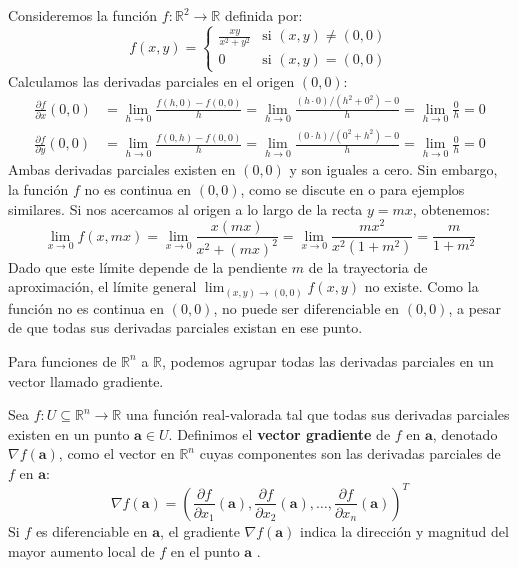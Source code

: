 \begin{counterexample}

Consideremos la función $f: \mathbb{R}^2 \to \mathbb{R}$ definida por:
\[ f(x,y) = \begin{cases} \frac{xy}{x^2+y^2} & \text{si } (x,y) \neq (0,0) \\ 0 & \text{si } (x,y) = (0,0) \end{cases} \]
Calculamos las derivadas parciales en el origen $(0,0)$:
\begin{align*}
\frac{\partial f}{\partial x}(0,0) &= \lim_{h \to 0} \frac{f(h,0) - f(0,0)}{h} = \lim_{h \to 0} \frac{(h \cdot 0)/(h^2+0^2) - 0}{h} = \lim_{h \to 0} \frac{0}{h} = 0 \\
\frac{\partial f}{\partial y}(0,0) &= \lim_{h \to 0} \frac{f(0,h) - f(0,0)}{h} = \lim_{h \to 0} \frac{(0 \cdot h)/(0^2+h^2) - 0}{h} = \lim_{h \to 0} \frac{0}{h} = 0
\end{align*}
Ambas derivadas parciales existen en $(0,0)$ y son iguales a cero. Sin embargo, la función $f$ no es continua en $(0,0)$, como se discute en \citet{Apostol1974} o \citet{Rudin1976} para ejemplos similares. Si nos acercamos al origen a lo largo de la recta $y=mx$, obtenemos:
\[ \lim_{x \to 0} f(x,mx) = \lim_{x \to 0} \frac{x(mx)}{x^2+(mx)^2} = \lim_{x \to 0} \frac{mx^2}{x^2(1+m^2)} = \frac{m}{1+m^2} \]
Dado que este límite depende de la pendiente $m$ de la trayectoria de aproximación, el límite general $\lim_{(x,y) \to (0,0)} f(x,y)$ no existe. Como la función no es continua en $(0,0)$, no puede ser diferenciable en $(0,0)$, a pesar de que todas sus derivadas parciales existan en ese punto.
\end{counterexample}

Para funciones de $\mathbb{R}^n$ a $\mathbb{R}$, podemos agrupar todas las derivadas parciales en un vector llamado gradiente.

\begin{definition}[Gradiente]
\label{def:gradient_general}
Sea $f: U \subseteq \mathbb{R}^n \to \mathbb{R}$ una función real-valorada tal que todas sus derivadas parciales existen en un punto $\mathbf{a} \in U$. Definimos el \textbf{vector gradiente} de $f$ en $\mathbf{a}$, denotado $\nabla f(\mathbf{a})$, como el vector en $\mathbb{R}^n$ cuyas componentes son las derivadas parciales de $f$ en $\mathbf{a}$:
\[ \nabla f(\mathbf{a}) = \left(\frac{\partial f}{\partial x_1}(\mathbf{a}), \frac{\partial f}{\partial x_2}(\mathbf{a}), \dots, \frac{\partial f}{\partial x_n}(\mathbf{a})\right)^T \]
Si $f$ es diferenciable en $\mathbf{a}$, el gradiente $\nabla f(\mathbf{a})$ indica la dirección y magnitud del mayor aumento local de $f$ en el punto $\mathbf{a}$ \citep{Apostol1974, Bishop2006}.
\end{definition}

